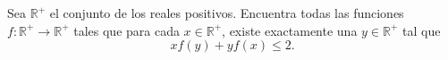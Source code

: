 Sea $\mathbb{R}^+$ el conjunto de los reales positivos. Encuentra todas las funciones $f:\mathbb{R}^+\to\mathbb{R}^+$ tales que para cada $x\in \mathbb{R}^+$, existe exactamente una $y\in\mathbb{R}^+$ tal que 
\[xf(y)+yf(x)\leq2.\]
